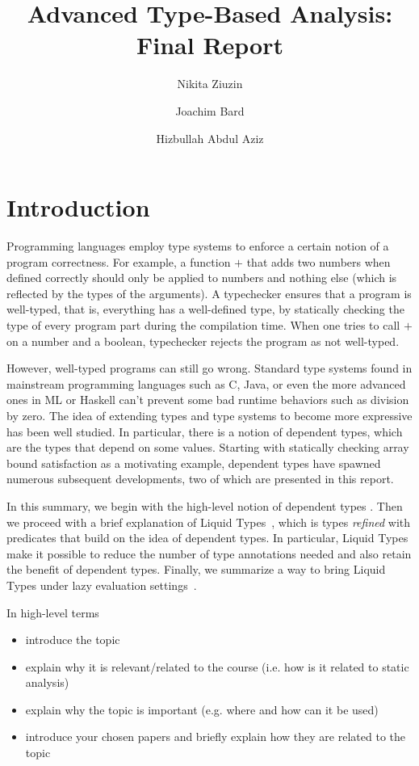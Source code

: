 \documentclass[a4paper,UKenglish]{lipics-v2016}
\title{Advanced Type-Based Analysis: Final Report}
\author[1]{Nikita Ziuzin}
\author[2]{Joachim Bard}
\author[3]{Hizbullah Abdul Aziz}
\affil[1]{\texttt{nzyuzin93@gmail.com}}
\affil[2]{\texttt{s9jobard@stud.uni-saarland.de}}
\affil[3]{\texttt{s8hijabb@stud.uni-saarland.de}}
\begin{document}
\maketitle


\section{Introduction}
\label{sec:intro}

  Programming languages employ type systems to enforce a certain notion of a
  program correctness. For example, a function $+$ that adds two numbers when
  defined correctly should only be applied to numbers and nothing else (which
  is reflected by the types of the arguments). A typechecker ensures that a
  program is well-typed, that is, everything has a well-defined type, by
  statically checking the type of every program part during the compilation
  time.  When one tries to call $+$ on a number and a boolean, typechecker
  rejects the program as not well-typed.

  However, well-typed programs can still go wrong. Standard type systems found
  in mainstream programming languages such as C, Java, or even the more
  advanced ones in ML or Haskell can't prevent some bad runtime behaviors such
  as division by zero. The idea of extending types and type systems to become
  more expressive has been well studied. In particular, there is a notion of
  dependent types, which are the types that depend on some values. Starting
  with statically checking array bound satisfaction as a motivating example,
  dependent types have spawned numerous subsequent developments, two of which
  are presented in this report.

  In this summary, we begin with the high-level notion of dependent types
  \cite{Xi:1998:EAB}. Then we proceed with a brief explanation of Liquid
  Types~\cite{Rondon:2008:LT}, which is types \emph{refined} with predicates
  that build on the idea of dependent types. In particular, Liquid Types make
  it possible to reduce the number of type annotations needed and also retain
  the benefit of dependent types.  Finally, we summarize a way to bring Liquid
  Types under lazy evaluation settings~\cite{Vazou:ICFP:2014}.

  In high-level terms
  \begin{itemize}
    \item introduce the topic

    \item explain why it is relevant/related to the course (i.e. how is it related
    to static analysis)

    \item explain why the topic is important (e.g. where and how can it be used)

    \item introduce your chosen papers and briefly explain how they are related
    to the topic
  \end{itemize}
\end{document}
